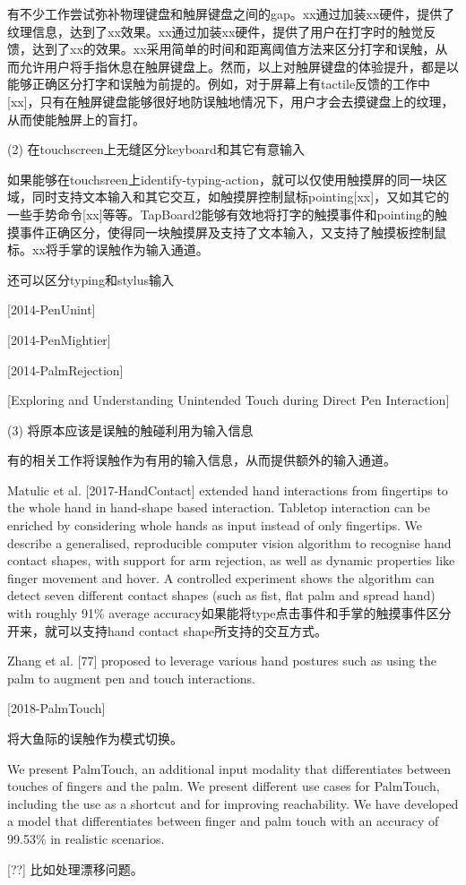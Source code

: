 有不少工作尝试弥补物理键盘和触屏键盘之间的gap。xx通过加装xx硬件，提供了纹理信息，达到了xx效果。xx通过加装xx硬件，提供了用户在打字时的触觉反馈，达到了xx的效果。xx采用简单的时间和距离阈值方法来区分打字和误触，从而允许用户将手指休息在触屏键盘上。然而，以上对触屏键盘的体验提升，都是以能够正确区分打字和误触为前提的。例如，对于屏幕上有tactile反馈的工作中[xx]，只有在触屏键盘能够很好地防误触地情况下，用户才会去摸键盘上的纹理，从而使能触屏上的盲打。

(2) 在touchscreen上无缝区分keyboard和其它有意输入

如果能够在touchsreen上identify-typing-action，就可以仅使用触摸屏的同一块区域，同时支持文本输入和其它交互，如触摸屏控制鼠标pointing[xx]，又如其它的一些手势命令[xx]等等。TapBoard2能够有效地将打字的触摸事件和pointing的触摸事件正确区分，使得同一块触摸屏及支持了文本输入，又支持了触摸板控制鼠标。xx将手掌的误触作为输入通道。

还可以区分typing和stylus输入

[2014-PenUnint]

[2014-PenMightier]

[2014-PalmRejection]

[Exploring and Understanding Unintended Touch during Direct Pen Interaction]

(3) 将原本应该是误触的触碰利用为输入信息

有的相关工作将误触作为有用的输入信息，从而提供额外的输入通道。

Matulic et al. [2017-HandContact] extended hand interactions from fingertips to the whole hand in hand-shape based interaction. Tabletop interaction can be enriched by considering whole hands as input instead of only fingertips. We describe a
generalised, reproducible computer vision algorithm to recognise hand contact shapes, with support for arm rejection, as well as dynamic properties like finger movement
and hover. A controlled experiment shows the algorithm can detect seven different contact shapes (such as fist, flat palm and spread hand) with roughly 91\% average accuracy如果能将type点击事件和手掌的触摸事件区分开来，就可以支持hand contact shape所支持的交互方式。

Zhang et al. [77] proposed to leverage various hand postures such as using the palm to augment pen and touch interactions.

[2018-PalmTouch]

将大鱼际的误触作为模式切换。

We present PalmTouch, an additional input modality that differentiates between touches of fingers and the palm. We present different use cases for PalmTouch, including the
use as a shortcut and for improving reachability.  We have developed a model that differentiates between finger and palm touch with an accuracy of 99.53\% in realistic scenarios.

[??] 比如处理漂移问题。


